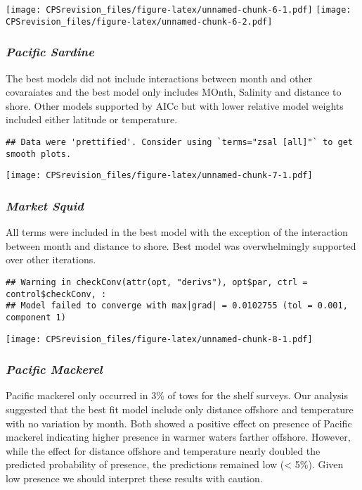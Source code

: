 \documentclass[
]{article}
\begin{document}
\texttt{[image: CPSrevision\_files/figure-latex/unnamed-chunk-6-1.pdf]}
\texttt{[image: CPSrevision\_files/figure-latex/unnamed-chunk-6-2.pdf]}

\hypertarget{pacific-sardine}{%
\subsubsection{\texorpdfstring{\emph{Pacific
Sardine}}{Pacific Sardine}}\label{pacific-sardine}}

The best models did not include interactions between month and other
covaraiates and the best model only includes MOnth, Salinity and
distance to shore. Other models supported by AICc but with lower
relative model weights included either latitude or temperature.

\begin{verbatim}
## Data were 'prettified'. Consider using `terms="zsal [all]"` to get smooth plots.
\end{verbatim}

\texttt{[image: CPSrevision\_files/figure-latex/unnamed-chunk-7-1.pdf]}

\hypertarget{market-squid}{%
\subsubsection{\texorpdfstring{\emph{Market
Squid}}{Market Squid}}\label{market-squid}}

All terms were included in the best model with the exception of the
interaction between month and distance to shore. Best model was
overwhelmingly supported over other iterations.

\begin{verbatim}
## Warning in checkConv(attr(opt, "derivs"), opt$par, ctrl = control$checkConv, :
## Model failed to converge with max|grad| = 0.0102755 (tol = 0.001, component 1)
\end{verbatim}

\texttt{[image: CPSrevision\_files/figure-latex/unnamed-chunk-8-1.pdf]}

\hypertarget{pacific-mackerel}{%
\subsubsection{\texorpdfstring{\emph{Pacific
Mackerel}}{Pacific Mackerel}}\label{pacific-mackerel}}

Pacific mackerel only occurred in 3\% of tows for the shelf surveys. Our
analysis suggested that the best fit model include only distance
offshore and temperature with no variation by month. Both showed a
positive effect on presence of Pacific mackerel indicating higher
presence in warmer waters farther offshore. However, while the effect
for distance offshore and temperature nearly doubled the predicted
probability of presence, the predictions remained low (\textless{} 5\%).
Given low presence we should interpret these results with caution.
\end{document}

